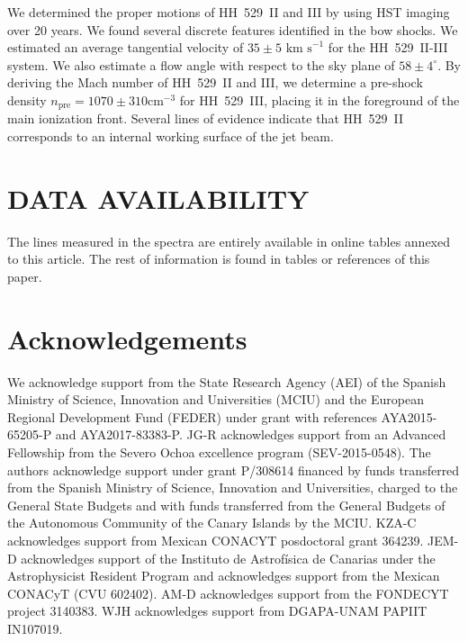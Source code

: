 \documentclass[fleqn,usenatbib]{mnras}
\begin{document}
We determined the proper motions of HH~529~II and III by using HST imaging over 20 years. We found several discrete features identified in the bow shocks. We estimated an average tangential velocity of $35 \pm 5 \text{ km s}^{-1}$ for the HH~529~II-III system. We also estimate a flow angle with respect to the sky plane of $58 \pm 4^\circ$. By deriving the Mach number of HH~529~II and III, we determine a pre-shock density $n_{\text{pre}}=1070 \pm 310 \text{cm}^{-3}$ for HH~529~III, placing it in the foreground of the main ionization front. Several lines of evidence
indicate that HH~529~II corresponds to an internal working surface of the jet beam.



\section*{DATA AVAILABILITY}
The lines measured in the spectra are entirely available in online tables annexed to this article. The rest of information is found in tables or references of this paper.


\section*{Acknowledgements}

We acknowledge support from the State Research Agency (AEI) of the Spanish Ministry of Science, Innovation and Universities (MCIU) and the European Regional Development Fund (FEDER) under grant with references AYA2015-65205-P and AYA2017-83383-P. JG-R acknowledges support from an Advanced Fellowship from the Severo Ochoa excellence program (SEV-2015-0548). The authors acknowledge support under grant P/308614 financed by funds transferred from the Spanish Ministry of Science, Innovation and Universities, charged to the General State Budgets and with funds transferred from the General Budgets of the Autonomous Community of the Canary Islands by the MCIU. KZA-C acknowledges support from Mexican CONACYT posdoctoral grant 364239. JEM-D acknowledges support of the Instituto de Astrof\'isica de Canarias under the Astrophysicist Resident Program and acknowledges support from the Mexican CONACyT (CVU 602402). AM-D acknowledges support from the FONDECYT project 3140383. WJH acknowledges support from DGAPA-UNAM PAPIIT IN107019.





\end{document}
